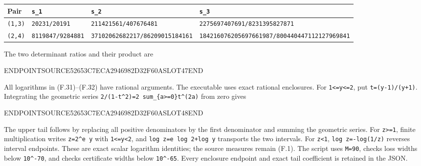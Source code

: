 {\def\LTcaptype{none} %
\begin{longtable}[]{@{}
  >{\raggedright\arraybackslash}p{}
  >{\raggedleft\arraybackslash}p{}
  >{\raggedleft\arraybackslash}p{}
  >{\raggedleft\arraybackslash}p{}@{}}
\toprule\noalign{}
\begin{minipage}[b]{\linewidth}\raggedright
Pair
\end{minipage} & \begin{minipage}[b]{\linewidth}\raggedleft
\texttt{s\_1}
\end{minipage} & \begin{minipage}[b]{\linewidth}\raggedleft
\texttt{s\_2}
\end{minipage} & \begin{minipage}[b]{\linewidth}\raggedleft
\texttt{s\_3}
\end{minipage} \\
\midrule\noalign{}
\endhead
\bottomrule\noalign{}
\endlastfoot
\texttt{(1,3)} & \texttt{20231/20191} & \texttt{211421561/407676481} & \texttt{2275697407691/8231395827871} \\
\texttt{(2,4)} & \texttt{8119847/9284881} & \texttt{37102062682217/86209015184161} & \texttt{184216076205697661987/800440447112127969841} \\
\end{longtable}
}

The two determinant ratios and their product are

ENDPOINTSOURCE52653C7ECA2946982D32F60ASLOT47END

All logarithms in (F.31)--(F.32) have rational arguments. The executable uses exact rational enclosures. For \texttt{1\textless{}=y\textless{}=2}, put \texttt{t=(y-1)/(y+1)}. Integrating the geometric series \texttt{2/(1-t\^{}2)=2\ sum\_\{a\textgreater{}=0\}t\^{}(2a)} from zero gives

ENDPOINTSOURCE52653C7ECA2946982D32F60ASLOT48END

The upper tail follows by replacing all positive denominators by the first denominator and summing the geometric series. For \texttt{z\textgreater{}=1}, finite multiplication writes \texttt{z=2\^{}e\ y} with \texttt{1\textless{}=y\textless{}2}, and \texttt{log\ z=e\ log\ 2+log\ y} transports the two intervals. For \texttt{z\textless{}1}, \texttt{log\ z=-log(1/z)} reverses interval endpoints. These are exact scalar logarithm identities; the source measures remain (F.1). The script uses \texttt{M=90}, checks loss widths below \texttt{10\^{}-70}, and checks certificate widths below \texttt{10\^{}-65}. Every enclosure endpoint and exact tail coefficient is retained in the JSON.

